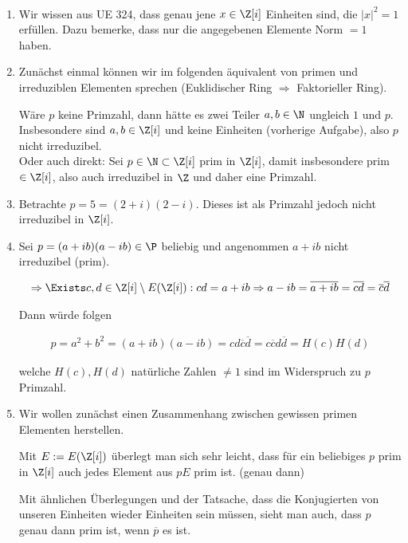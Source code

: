 \begin{solution}
\leavevmode \\
\begin{enumerate}
  \item Wir wissen aus UE 324, dass genau jene $x \in \Z[i]$ Einheiten sind,
  die $|x|^2 = 1$ erfüllen. Dazu bemerke, dass nur die angegebenen Elemente Norm $= 1$ haben.

  \item Zunächst einmal können wir im folgenden äquivalent von primen und irreduziblen Elementen sprechen (Euklidischer Ring $\Rightarrow$ Faktorieller Ring).

  Wäre $p$ keine Primzahl, dann hätte es zwei Teiler $a,b \in \N$ ungleich $1$ und $p$. Insbesondere sind $a,b \in \Z [i]$ und keine Einheiten (vorherige Aufgabe), also $p$ nicht irreduzibel. \\
  Oder auch direkt: Sei $p \in \N \subset \Z[i]$ prim in $\Z[i]$, damit insbesondere prim $\in \Z[i]$,
  also auch irreduzibel in $\Z$ und daher eine Primzahl.

  \item Betrachte $p = 5 = (2+i)(2-i)$. Dieses ist als Primzahl jedoch nicht irreduzibel in $\Z [i]$.

  \item Sei $p = (a+ib)(a-ib) \in \P$ beliebig und angenommen $a+ib$ nicht irreduzibel (prim).

  \begin{align*}
    \Rightarrow \Exists c,d \in \Z [i] \setminus E(\Z [i]):  cd = a+ib \Rightarrow a - ib = \overline{a+ib} = \overline{cd} = \overline{c} \overline{d}
  \end{align*}

  Dann würde folgen

  \begin{align*}
    p = a^2 + b^2 = (a+ib)(a-ib) = cd\overline{c} \overline{d} = c\overline{c}d \overline{d} = H(c)H(d)
  \end{align*}

  welche $H(c),H(d)$ natürliche Zahlen $\neq 1$ sind im Widerspruch zu $p$ Primzahl.

  \item Wir wollen zunächst einen Zusammenhang zwischen gewissen primen Elementen herstellen.

  Mit $E:= E(\Z [i])$ überlegt man sich sehr leicht, dass für ein beliebiges $p$ prim in $\Z [i]$ auch jedes Element aus $pE$ prim ist. (genau dann)

  Mit ähnlichen Überlegungen und der Tatsache, dass die Konjugierten von unseren Einheiten wieder Einheiten sein müssen, sieht man auch, dass $p$
  genau dann prim ist, wenn $\overline{p}$ es ist.


\end{enumerate}
\end{solution}
